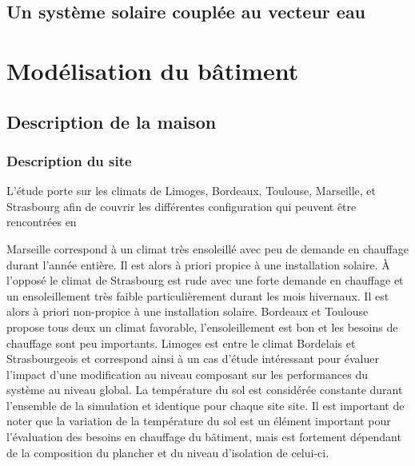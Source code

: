 

\subsection{Un système solaire couplée au vecteur eau} %
\label{sub:description_du_système_vecteur_eau}




\section{Modélisation du bâtiment} %
\label{sec:modelisation_du_batiment}


\subsection{Description de la maison} %
\label{sub:description_de_la_maison}

\subsubsection{Description du site} %
\label{ssub:modelisation_du_site}
L’étude porte sur les climats de Limoges, Bordeaux, Toulouse, Marseille, et Strasbourg
afin de couvrir les différentes configuration qui peuvent être rencontrées en

Marseille correspond à un climat très ensoleillé avec peu de demande en chauffage
durant l’année entière. Il est alors à priori propice à une installation solaire.
À l’opposé le climat de Strasbourg est rude avec une forte demande en chauffage et
un ensoleillement très faible particulièrement durant les mois hivernaux. Il est alors
à priori non-propice à une installation solaire. Bordeaux et Toulouse propose tous deux
un climat favorable, l’ensoleillement est bon et les besoins de chauffage sont peu
importants. Limoges est entre le climat Bordelais et Strasbourgeois et correspond
ainsi à un cas d’étude intéressant pour évaluer l’impact d’une modification au niveau
composant sur les performances du système au niveau global.
La température du sol est considérée constante durant l’ensemble de la simulation
et identique pour chaque site site. Il est important de noter que la variation de
la température du sol est un élément important pour l’évaluation des besoins en chauffage
du bâtiment, mais est fortement dépendant de la composition du plancher et du niveau
d’isolation de celui-ci.


